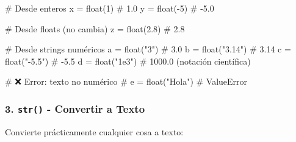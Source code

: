 \documentclass[
  doc,
  floatsintext,
  longtable,
  a4paper,
  nolmodern,
  notxfonts,
  notimes,
  12pt,
  colorlinks=true,linkcolor=blue,citecolor=blue,urlcolor=blue]{apa7}
\newenvironment{Shaded}{\begin{snugshade}}{\end{snugshade}}
\newcommand{\BuiltInTok}[1]{\textcolor[rgb]{0.00,0.23,0.31}{#1}}
\newcommand{\CommentTok}[1]{\textcolor[rgb]{0.37,0.37,0.37}{#1}}
\newcommand{\DecValTok}[1]{\textcolor[rgb]{0.68,0.00,0.00}{#1}}
\newcommand{\FloatTok}[1]{\textcolor[rgb]{0.68,0.00,0.00}{#1}}
\newcommand{\NormalTok}[1]{\textcolor[rgb]{0.00,0.23,0.31}{#1}}
\newcommand{\OperatorTok}[1]{\textcolor[rgb]{0.37,0.37,0.37}{#1}}
\newcommand{\StringTok}[1]{\textcolor[rgb]{0.13,0.47,0.30}{#1}}
\begin{document}
\begin{Shaded}
\begin{Highlighting}[]
\CommentTok{\# Desde enteros}
\NormalTok{x }\OperatorTok{=} \BuiltInTok{float}\NormalTok{(}\DecValTok{1}\NormalTok{)     }\CommentTok{\# 1.0}
\NormalTok{y }\OperatorTok{=} \BuiltInTok{float}\NormalTok{(}\OperatorTok{{-}}\DecValTok{5}\NormalTok{)    }\CommentTok{\# {-}5.0}

\CommentTok{\# Desde floats (no cambia)}
\NormalTok{z }\OperatorTok{=} \BuiltInTok{float}\NormalTok{(}\FloatTok{2.8}\NormalTok{)   }\CommentTok{\# 2.8}

\CommentTok{\# Desde strings numéricos}
\NormalTok{a }\OperatorTok{=} \BuiltInTok{float}\NormalTok{(}\StringTok{"3"}\NormalTok{)   }\CommentTok{\# 3.0}
\NormalTok{b }\OperatorTok{=} \BuiltInTok{float}\NormalTok{(}\StringTok{"3.14"}\NormalTok{) }\CommentTok{\# 3.14}
\NormalTok{c }\OperatorTok{=} \BuiltInTok{float}\NormalTok{(}\StringTok{"{-}5.5"}\NormalTok{) }\CommentTok{\# {-}5.5}
\NormalTok{d }\OperatorTok{=} \BuiltInTok{float}\NormalTok{(}\StringTok{"1e3"}\NormalTok{) }\CommentTok{\# 1000.0 (notación científica)}

\CommentTok{\# ❌ Error: texto no numérico}
\CommentTok{\# e = float("Hola")  \# ValueError}
\end{Highlighting}
\end{Shaded}

\subsubsection{\texorpdfstring{3. \texttt{str()} - Convertir a
Texto}{3. str() - Convertir a Texto}}\label{str---convertir-a-texto}

Convierte prácticamente cualquier cosa a texto:
\end{document}
